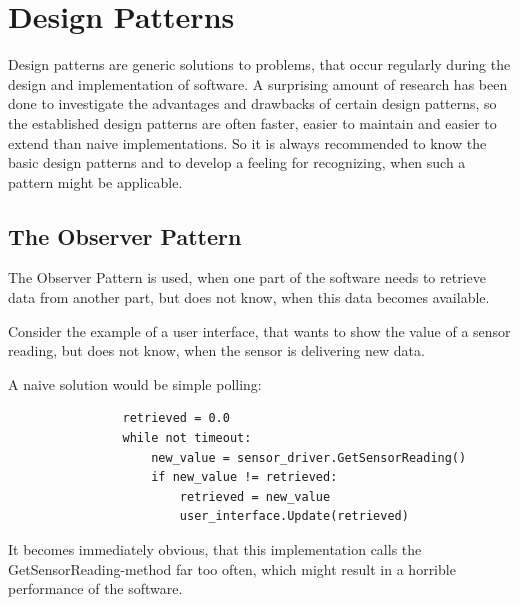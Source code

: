 	\section{Design Patterns}
		Design patterns are generic solutions to problems, that occur regularly during the design and implementation of software.
		A surprising amount of research has been done to investigate the advantages and drawbacks of certain design patterns, so the established design patterns are often faster, easier to maintain and easier to extend than naive implementations.
		So it is always recommended to know the basic design patterns and to develop a feeling for recognizing, when such a pattern might be applicable.

		\subsection{The Observer Pattern}
			\label{ObserverPattern}
			The Observer Pattern is used, when one part of the software needs to retrieve data from another part, but does not know, when this data becomes available.

			Consider the example of a user interface, that wants to show the value of a sensor reading, but does not know, when the sensor is delivering new data.

			A naive solution would be simple polling:
			\begin{verbatim}
				retrieved = 0.0
				while not timeout:
					new_value = sensor_driver.GetSensorReading()
					if new_value != retrieved:
						retrieved = new_value
						user_interface.Update(retrieved)
			\end{verbatim}
			It becomes immediately obvious, that this implementation calls the GetSensorReading-method far too often, which might result in a horrible performance of the software.

